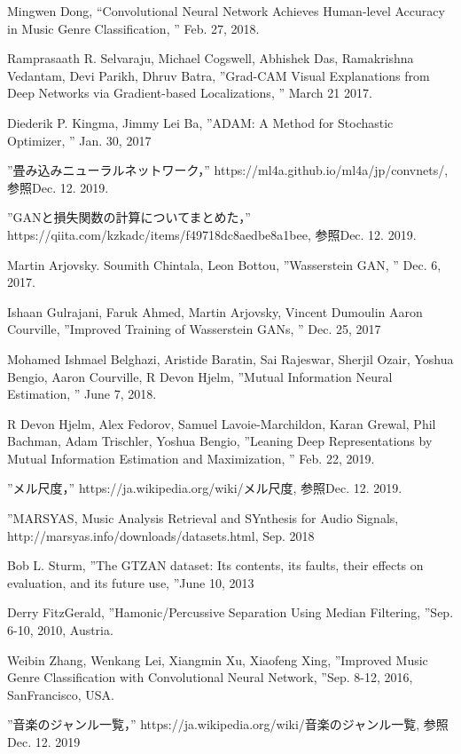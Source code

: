 

\begin{thebibliography}{99}%

Mingwen Dong, “Convolutional Neural Network Achieves Human-level Accuracy in Music Genre Classification, ” Feb. 27, 2018.

Ramprasaath R. Selvaraju, Michael Cogswell, Abhishek Das, Ramakrishna Vedantam, Devi Parikh, Dhruv Batra, ”Grad-CAM Visual Explanations from Deep Networks via Gradient-based Localizations, ” March 21 2017.

Diederik P. Kingma, Jimmy Lei Ba, ”ADAM: A Method for Stochastic Optimizer, ” Jan. 30, 2017

”畳み込みニューラルネットワーク，” https://ml4a.github.io/ml4a/jp/convnets/, 参照Dec. 12. 2019.

”GANと損失関数の計算についてまとめた，” \\
https://qiita.com/kzkadc/items/f49718dc8aedbe8a1bee, 参照Dec. 12. 2019.

Martin Arjovsky. Soumith Chintala, Leon Bottou, ”Wasserstein GAN, ” Dec. 6, 2017.

Ishaan Gulrajani, Faruk Ahmed, Martin Arjovsky, Vincent Dumoulin Aaron Courville, ”Improved Training of Wasserstein GANs, ” Dec. 25, 2017

Mohamed Ishmael Belghazi, Aristide Baratin, Sai Rajeswar, Sherjil Ozair, Yoshua Bengio, Aaron Courville, R Devon Hjelm, ”Mutual Information Neural Estimation, ” June 7, 2018.

R Devon Hjelm, Alex Fedorov, Samuel Lavoie-Marchildon, Karan Grewal, Phil Bachman, Adam Trischler, Yoshua Bengio, ”Leaning Deep Representations by Mutual Information Estimation and Maximization, ” Feb. 22, 2019.

”メル尺度，” https://ja.wikipedia.org/wiki/メル尺度, 参照Dec. 12. 2019.

”MARSYAS, Music Analysis Retrieval and SYnthesis for Audio Signals, http://marsyas.info/downloads/datasets.html, Sep. 2018

Bob L. Sturm, ”The GTZAN dataset: Its contents, its faults, their effects on evaluation, and its future use, ”June 10, 2013

Derry FitzGerald, ”Hamonic/Percussive Separation Using Median Filtering, ”Sep. 6-10, 2010, Austria.

Weibin Zhang, Wenkang Lei, Xiangmin Xu, Xiaofeng Xing, ”Improved Music Genre Classification with Convolutional Neural Network, ”Sep. 8-12, 2016, SanFrancisco, USA.

”音楽のジャンル一覧，” https://ja.wikipedia.org/wiki/音楽のジャンル一覧, 参照Dec. 12. 2019

\end{thebibliography}